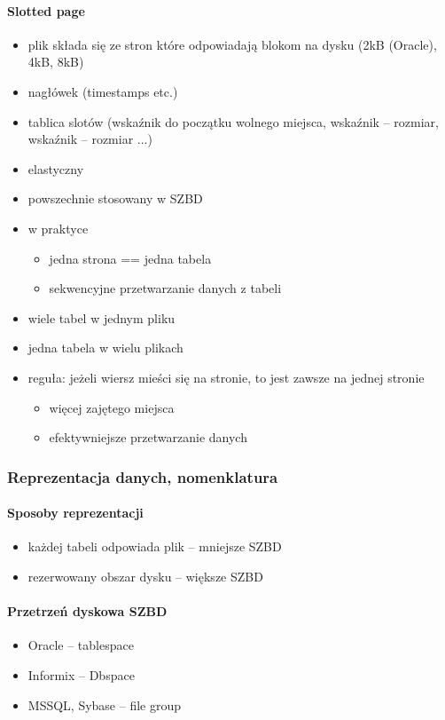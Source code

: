 \documentclass[12pt]{article}
\begin{document}
\paragraph{Slotted page}
\begin{itemize}
\item plik składa się ze stron które odpowiadają blokom na dysku (2kB (Oracle), 4kB, 8kB)
\item nagłówek (timestamps etc.)
\item tablica slotów (wskaźnik do początku wolnego miejsca, wskaźnik -- rozmiar, wskaźnik -- rozmiar ...)
\item elastyczny
\item powszechnie stosowany w \ac{SZBD}
\item w praktyce
\begin{itemize}
\item jedna strona == jedna tabela
\item sekwencyjne przetwarzanie danych z tabeli
\end{itemize}
\item wiele tabel w jednym pliku
\item jedna tabela w wielu plikach
\item reguła: jeżeli wiersz mieści się na stronie, to jest zawsze na jednej stronie
\begin{itemize}
\item więcej zajętego miejsca
\item efektywniejsze przetwarzanie danych
\end{itemize}
\end{itemize}

\subsubsection{Reprezentacja danych, nomenklatura}
\paragraph{Sposoby reprezentacji}
\begin{itemize}
\item każdej tabeli odpowiada plik -- mniejsze \ac{SZBD}
\item rezerwowany obszar dysku -- większe \ac{SZBD}
\end{itemize}

\paragraph{Przetrzeń dyskowa \ac{SZBD}}
\begin{itemize}
\item Oracle -- tablespace
\item Informix -- Dbspace
\item MSSQL, Sybase -- file group
\end{itemize}
\end{document}
